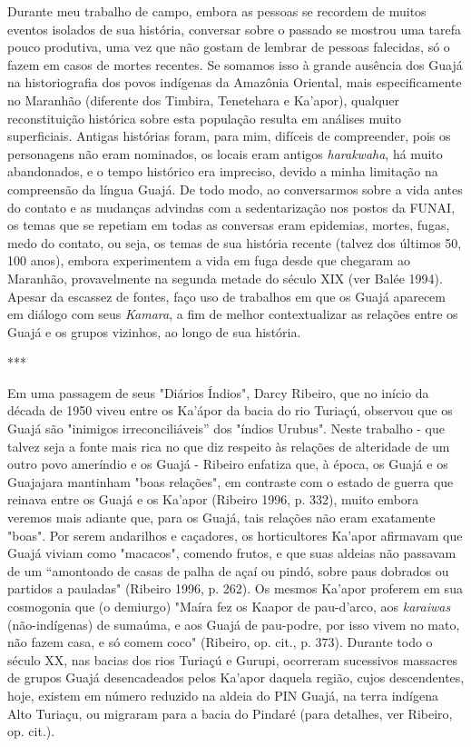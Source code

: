 Durante meu trabalho de campo, embora as pessoas se recordem de muitos
eventos isolados de sua história, conversar sobre o passado se mostrou
uma tarefa pouco produtiva, uma vez que não gostam de lembrar de pessoas
falecidas, só o fazem em casos de mortes recentes. Se somamos isso à
grande ausência dos Guajá na historiografia dos povos indígenas da
Amazônia Oriental, mais especificamente no Maranhão (diferente dos
Timbira, Tenetehara e Ka'apor), qualquer reconstituição histórica sobre
esta população resulta em análises muito superficiais. Antigas histórias
foram, para mim, difíceis de compreender, pois os personagens não eram
nominados, os locais eram antigos \emph{harakwaha}, há muito
abandonados, e o tempo histórico era impreciso, devido a minha limitação
na compreensão da língua Guajá. De todo modo, ao conversarmos sobre a
vida antes do contato e as mudanças advindas com a sedentarização nos
postos da FUNAI, os temas que se repetiam em todas as conversas eram
epidemias, mortes, fugas, medo do contato, ou seja, os temas de sua
história recente (talvez dos últimos 50, 100 anos), embora experimentem
a vida em fuga desde que chegaram ao Maranhão, provavelmente na segunda
metade do século XIX (ver Balée 1994). Apesar da escassez de fontes,
faço uso de trabalhos em que os Guajá aparecem em diálogo com seus
\emph{Kamara}, a fim de melhor contextualizar as relações entre os Guajá
e os grupos vizinhos, ao longo de sua história.

***

Em uma passagem de seus "Diários Índios", Darcy Ribeiro, que no início
da década de 1950 viveu entre os Ka'ápor da bacia do rio Turiaçú,
observou que os Guajá são "inimigos irreconciliáveis'' dos "índios
Urubus". Neste trabalho - que talvez seja a fonte mais rica no que diz
respeito às relações de alteridade de um outro povo ameríndio e os Guajá
- Ribeiro enfatiza que, à época, os Guajá e os Guajajara mantinham "boas
relações", em contraste com o estado de guerra que reinava entre os
Guajá e os Ka'apor (Ribeiro 1996, p. 332), muito embora veremos mais
adiante que, para os Guajá, tais relações não eram exatamente "boas".
Por serem andarilhos e caçadores, os horticultores Ka'apor afirmavam que
Guajá viviam como "macacos", comendo frutos, e que suas aldeias não
passavam de um ``amontoado de casas de palha de açaí ou pindó, sobre
paus dobrados ou partidos a pauladas" (Ribeiro 1996, p. 262). Os mesmos
Ka'apor proferem em sua cosmogonia que (o demiurgo) "Maíra fez os Kaapor
de pau-d'arco, aos \emph{karaiwas} (não-indígenas) de sumaúma, e aos
Guajá de pau-podre, por isso vivem no mato, não fazem casa, e só comem
coco" (Ribeiro, op. cit., p. 373). Durante todo o século XX, nas bacias
dos rios Turiaçú e Gurupi, ocorreram sucessivos massacres de grupos
Guajá desencadeados pelos Ka'apor daquela região, cujos descendentes,
hoje, existem em número reduzido na aldeia do PIN Guajá, na terra
indígena Alto Turiaçu, ou migraram para a bacia do Pindaré (para
detalhes, ver Ribeiro, op. cit.).

